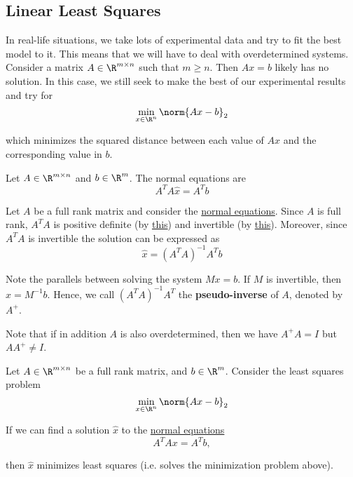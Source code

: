 \subsection{Linear Least Squares}\label{ed56ce5}

\label{c5a0d84}

In real-life situations, we take lots of experimental data and try to fit the
best model to it. This means that we will have to deal with overdetermined
systems. Consider a matrix $A\in\R^{m\times n}$ such that $m\geq n$. Then
$Ax=b$ likely has no solution. In this case, we still seek to make the best of
our experimental results and try for
$$
  \min_{x\in\R^n}\norm{Ax-b}_2
$$

which minimizes the squared distance between each value of $Ax$ and the
corresponding value in $b$.

\label{b17beaa}

Let $A\in\R^{m\times n}$ and $b\in\R^m$. The normal equations are
$$
  A^TA\hat x=A^Tb
$$

\label{f8744da}

Let $A$ be a full rank matrix and consider the \href{b17beaa}{normal
equations}. Since $A$ is full rank, $A^TA$ is positive definite (by
\href{fd1f53e}{this}) and invertible (by \href{d4f72eb}{this}). Moreover, since
$A^TA$ is invertible the solution can be expressed as
$$
  \hat x=(A^TA)^{-1}A^Tb
$$

Note the parallels between solving the system $Mx=b$. If $M$ is invertible,
then $x=M^{-1}b$. Hence, we call $(A^TA)^{-1}A^T$ the \textbf{pseudo-inverse}
of $A$, denoted by $A^+$.

Note that if in addition $A$ is also overdetermined, then we have $A^+A=I$ but
$AA^+\neq I$.

\label{c10737c}

Let $A\in\R^{m\times n}$ be a full rank matrix, and $b\in\R^m$. Consider the
least squares problem
$$
  \min_{x\in\R^n}\norm{Ax-b}_2
$$

If we can find a solution $\hat x$ to the \href{b17beaa}{normal equations}
$$
  A^TAx=A^Tb,
$$

then $\hat x$ minimizes least squares (i.e. solves the minimization problem
above).


